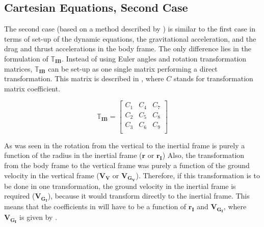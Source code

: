  
\subsection{Cartesian Equations, Second Case}
\label{subsec:careq2}
The second case (based on a method described by \citep{bergsma2015application}) is similar to the first case in terms of set-up of the dynamic equations, the gravitational acceleration, and the drag and thrust accelerations in the body frame. The only difference lies in the formulation of $\mathbb{T}_{\mathbf{IB}}$. Instead of using Euler angles and rotation transformation matrices, $\mathbb{T}_{\mathbf{IB}}$ can be set-up as one single matrix performing a direct transformation. This matrix is described in , where $C$ stands for transformation matrix coefficient. 

\begin{equation} \label{eq:transMatCoef}
\mathbb{T}_{\mathbf{IB}} = 
\left[
\begin{matrix}
C_{1} & C_{4} & C_{7} \\
C_{2} & C_{5} & C_{8} \\
C_{3} & C_{6} & C_{9} \\
\end{matrix}
\right]
\end{equation}


\noindent
As was seen in  the rotation from the vertical to the inertial frame is purely a function of the radius in the inertial frame ($\mathbf{r}$ or $\mathbf{r_{I}}$) Also, the transformation from the body frame to the vertical frame was purely a function of the ground velocity in the vertical frame ($\mathbf{V_{V}}$ or $\mathbf{V_{G_{V}}}$). Therefore, if this transformation is to be done in one transformation, the ground velocity in the inertial frame is required ($\mathbf{V_{G_{I}}}$), because it would transform directly to the inertial frame. This means that the coefficients in  will have to be a function of $\mathbf{r_{I}}$ and $\mathbf{V_{G_{I}}}$, where $\mathbf{V_{G_{I}}}$ is given by .

